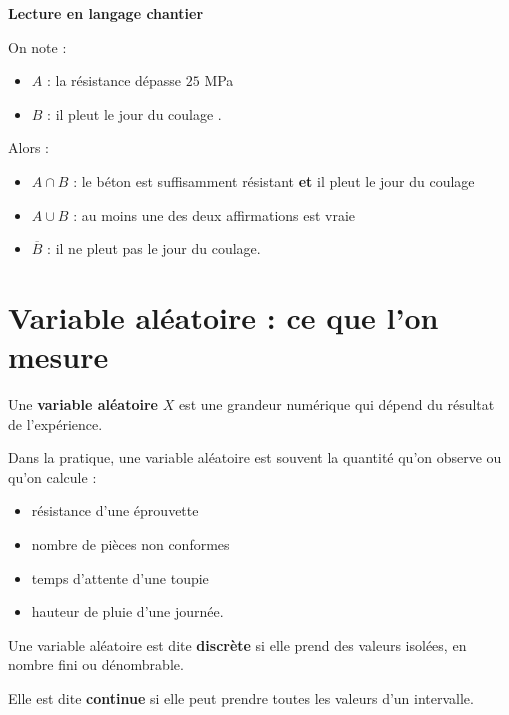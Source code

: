 \begin{Ex}
\textbf{Lecture en langage chantier}

On note :
\begin{itemize}
    \item $A$ : \og la résistance dépasse $25$ MPa \fg  
    \item $B$ : \og il pleut le jour du coulage \fg.
\end{itemize}

Alors :
\begin{itemize}
    \item $A \cap B$ : le béton est suffisamment résistant \textbf{et} il pleut le jour du coulage  
    \item $A \cup B$ : au moins une des deux affirmations est vraie  
    \item $\overline{B}$ : il ne pleut pas le jour du coulage.
\end{itemize}
\end{Ex}

\section{Variable aléatoire : ce que l'on mesure}

\begin{Def}
Une \textbf{variable aléatoire} $X$ est une grandeur numérique qui dépend du résultat de l'expérience.
\end{Def}

\begin{Rmq}
Dans la pratique, une variable aléatoire est souvent la quantité qu'on observe ou qu'on calcule :
\begin{itemize}
    \item résistance d'une éprouvette  
    \item nombre de pièces non conformes  
    \item temps d'attente d'une toupie  
    \item hauteur de pluie d'une journée.
\end{itemize}
\end{Rmq}

\begin{Def}
Une variable aléatoire est dite \textbf{discrète} si elle prend des valeurs isolées, en nombre fini ou dénombrable.

Elle est dite \textbf{continue} si elle peut prendre toutes les valeurs d'un intervalle.
\end{Def}

